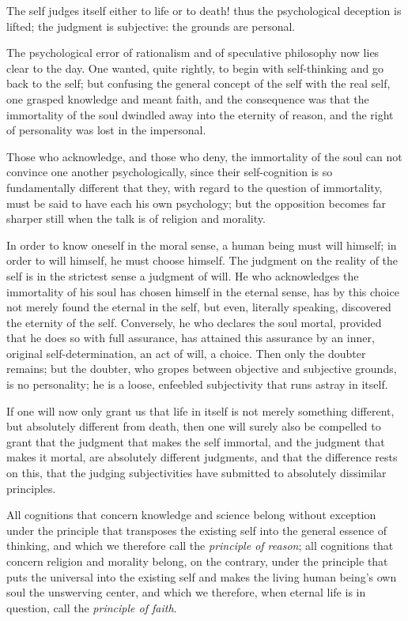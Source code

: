 \documentclass[12pt,a4paper,openany]{book}
\newcommand{\opage}[1]{\marginnote{\footnotesize\textit{[#1]}}}
\begin{document}
The self judges itself either to life or to
death! thus the psychological deception is lifted;
the judgment is subjective: the grounds are personal.

The psychological error of rationalism and of speculative philosophy
now lies clear to the day. One wanted,
quite rightly, to begin with self-thinking and go
\setcounter{footnote}{0}%
\opage{619}back to the self; but confusing the general concept of the self
with the real self, one grasped knowledge and meant
faith, and the consequence was that the immortality of the soul dwindled
away into the eternity of reason, and the right of personality was
lost in the impersonal.

Those who acknowledge, and those who deny, the immortality
of the soul can not convince one another psychologically,
since their self-cognition is so fundamentally different
that they, with regard to the question of immortality,
must be said to have each his own psychology; but the opposition
becomes far sharper still when the talk is
of religion and morality.

In order to know oneself in the moral sense, a
human being must will himself; in order to will himself, he must
choose himself. The judgment on the reality of the self is
in the strictest sense a judgment of will. He who acknowledges
the immortality of his soul has chosen himself in the eternal
sense, has by this choice not merely found the eternal
in the self, but even, literally speaking, discovered the eternity
of the self. Conversely, he who declares the soul
mortal, provided that he does so with full assurance,
has attained this assurance by an inner, original self-determination, an act of will, a choice. Then only
the doubter remains; but the doubter, who gropes between
objective and subjective grounds, is no personality;
he is a loose, enfeebled subjectivity that runs
astray in itself.

If one will now only grant us that life in
itself is not merely something different, but absolutely different
from death, then one will surely also be compelled to
grant that the judgment that makes the self immortal, and
\setcounter{footnote}{0}%
\opage{620}the judgment that makes it mortal, are absolutely different
judgments, and that the difference rests on this, that the
judging subjectivities have submitted to absolutely
dissimilar principles.

All cognitions that concern knowledge and science
belong without exception under the principle that transposes
the existing self into the general essence of thinking,
and which we therefore call the \emph{principle of reason}; all cognitions
that concern religion and morality belong, on the contrary,
under the principle that puts the universal into the
existing self and makes the living human being's own
soul the unswerving center, and which we therefore, when
eternal life is in question, call the \emph{principle of faith}.
\end{document}
